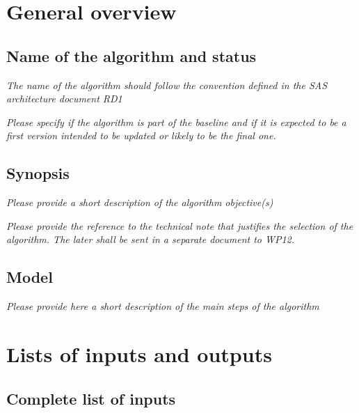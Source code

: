 \documentclass[a4paper, oneside, 11pt, article, english]{memoir}
\begin{document}
\clearpage
\chapter{General overview}
\label{chap:overview}

\section{Name of the algorithm and status}
\label{sec:name}

\emph{The name of the algorithm should follow the convention defined in the SAS
architecture document {RD1}}

\emph{Please specify if the algorithm is part of the baseline and if it is expected
to be a first version intended to be updated or likely to be the final one.}


\section{Synopsis}
\label{sec:synopsis}

\emph{Please provide a short description of the algorithm objective(s)}

\emph{Please provide the reference to the technical note that justifies the selection
of the algorithm. The later shall be sent in a separate document to WP12.}


\section{Model}
\label{sec:model}

\emph{Please provide here a short description of the main steps of the algorithm}


\clearpage
\chapter{Lists of inputs and outputs}
\label{chap:inputoutput}

\section{Complete list of inputs}
\label{sec:input}
\end{document}
